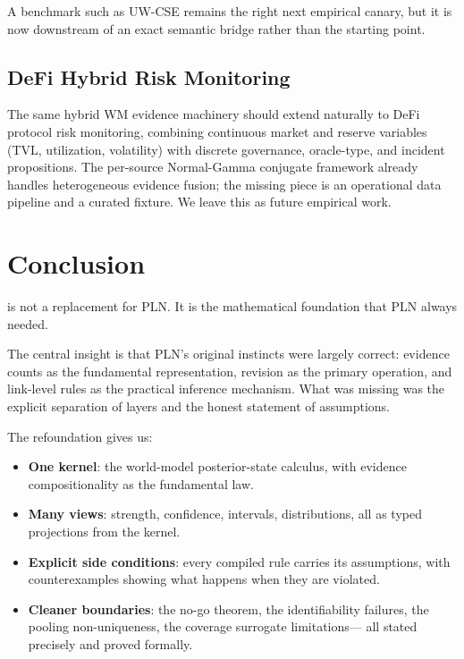 \documentclass[11pt,openany]{report}
\begin{document}
A benchmark such as UW-CSE \cite{richardson2006markov} remains the right
next empirical canary, but it is now downstream of an exact semantic
bridge rather than the starting point.

\section{DeFi Hybrid Risk Monitoring}

The same hybrid WM evidence machinery should extend naturally to
DeFi protocol risk monitoring, combining continuous market and reserve
variables (TVL, utilization, volatility) with discrete governance,
oracle-type, and incident propositions.  The per-source
Normal-Gamma conjugate framework already handles heterogeneous
evidence fusion; the missing piece is an operational data pipeline
and a curated fixture.  We leave this as future empirical work.


\chapter{Conclusion}
\label{ch:conclusion}

\xiPLN{} is not a replacement for PLN.  It is the mathematical foundation
that PLN always needed.

The central insight is that PLN's original instincts were largely correct:
evidence counts as the fundamental representation, revision as the primary
operation, and link-level rules as the practical inference mechanism.  What
was missing was the explicit separation of layers and the honest statement
of assumptions.

The refoundation gives us:
\begin{itemize}
\item \textbf{One kernel}: the world-model posterior-state calculus, with
  evidence compositionality as the fundamental law.
\item \textbf{Many views}: strength, confidence, intervals, distributions,
  all as typed projections from the kernel.
\item \textbf{Explicit side conditions}: every compiled rule carries its
  assumptions, with counterexamples showing what happens when they are
  violated.
\item \textbf{Cleaner boundaries}: the no-go theorem, the identifiability
  failures, the pooling non-uniqueness, the coverage surrogate limitations---
  all stated precisely and proved formally.
\end{itemize}
\end{document}
